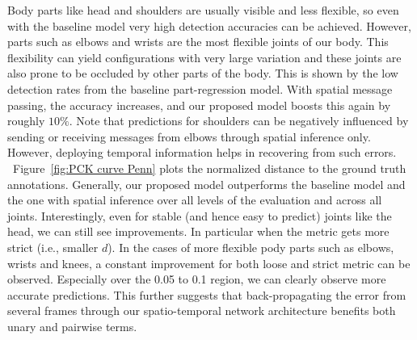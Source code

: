 \documentclass[10pt,twocolumn,letterpaper]{article}
\newcommand{\figref}[1]{Figure~\ref{#1}}
\newcommand{\note}[3]{{\color{#2}[#1: #3]}}
\newcommand{\OH}[1]{\note{O}{red}{#1}}
\begin{document}
\begin{figure*}[h]
\begin{center}
\hspace*{-1.5em}
\hspace*{-1.5em}
\vspace{-3.5mm}
\hspace*{-1.5em}
%
\hspace*{-1.5em}
%
\end{center}
   \caption{PCK curve for Penn Action dataset. We compare our proposed model with two baselines -- ConvNet-only and spatial inference-only. Ours yields consistent accuracy improvements across the entire range of strictness.}
\label{fig:PCK curve Penn}
\end{figure*}
Body parts like head and shoulders are usually visible and less flexible, so even with the baseline model very high detection accuracies can be achieved. However, parts such as elbows and wrists are the most flexible joints of our body. This flexibility can yield configurations with very large variation and these joints are also prone to be occluded by other parts of the body. This is shown by the low detection rates from the baseline part-regression model. With spatial message passing, the accuracy increases, and our proposed model boosts this again by roughly $10\%$. Note that predictions for shoulders can be negatively influenced by sending or receiving messages from elbows through spatial inference only. However, deploying temporal information helps in recovering from such errors.
~\figref{fig:PCK curve Penn} plots the normalized distance to the ground truth annotations. Generally, our proposed model outperforms the baseline model and the one with spatial inference over all levels of the evaluation and across all joints. Interestingly, even for stable (and hence easy to predict) joints like the head, we can still see improvements. In particular when the metric gets more strict (i.e., smaller $d$). In the cases of more flexible pody parts such as elbows, wrists and knees, a constant improvement for both loose and strict metric can be observed. Especially over the 0.05 to 0.1 region, we can clearly observe more accurate predictions. This further suggests that back-propagating the error from several frames through our spatio-temporal network architecture benefits both unary and pairwise terms.
\end{document}
